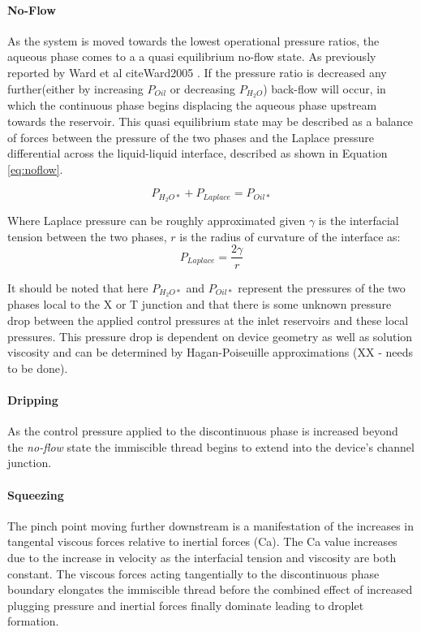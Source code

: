 \paragraph{No-Flow}
As the system is moved towards the lowest operational pressure ratios, the aqueous phase comes to a a quasi equilibrium no-flow state. As previously reported by Ward et al cite{Ward2005} . If the pressure ratio is decreased any further(either by increasing $P_{Oil}$ or decreasing $P_{H_2O}$) back-flow will occur, in which the continuous phase begins displacing the aqueous phase upstream towards the reservoir. This quasi equilibrium state may be described as a balance of forces between the pressure of the two phases and the Laplace pressure differential across the liquid-liquid interface, described as shown in Equation \vref{eq:noflow}.

\begin{equation}
P_{H_2O*} + P_{Laplace} = P_{Oil*} 
\label{eq:noflow}
\end{equation}

Where Laplace pressure can be roughly approximated given $\gamma$ is the interfacial tension between the two phases, $r$ is the radius of curvature of the interface as:
\begin{equation}
 P_{Laplace} = \frac{2 \gamma}{r}
\label{eq:laplace}
\end{equation}

It should be noted that here $P_{H_2O*}$ and $P_{Oil*}$ represent the pressures of the two phases local to the X or T junction and that there is some unknown pressure drop between the applied control pressures at the inlet reservoirs and these local pressures. This pressure drop is dependent on device geometry as well as solution viscosity and can be determined by Hagan-Poiseuille approximations (XX - needs to be done). 
 
\paragraph{Dripping}

As the control pressure applied to the discontinuous phase is increased beyond the \emph{no-flow} state the immiscible thread begins to extend into the device's channel junction. 


\paragraph{Squeezing}

The pinch point moving further downstream is a manifestation of the increases in tangental viscous forces relative to inertial forces (Ca). The Ca value increases due to the increase in velocity as the interfacial tension and viscosity are both constant. The viscous forces acting tangentially to the discontinuous phase boundary elongates the immiscible thread before the combined effect of increased plugging pressure and inertial forces finally dominate leading to droplet formation.


